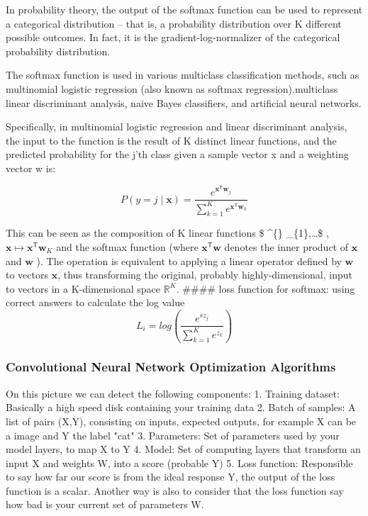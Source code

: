 \documentclass[11pt]{article}
\begin{document}
In probability theory, the output of the softmax function can be used to
represent a categorical distribution -- that is, a probability
distribution over K different possible outcomes. In fact, it is the
gradient-log-normalizer of the categorical probability distribution.

 The softmax function is used in various multiclass classification
methods, such as multinomial logistic regression (also known as softmax
regression).multiclass linear discriminant analysis, naive Bayes
classifiers, and artificial neural networks.

 Specifically, in multinomial logistic regression and linear
discriminant analysis, the input to the function is the result of K
distinct linear functions, and the predicted probability for the j'th
class given a sample vector x and a weighting vector w is:

\[{\displaystyle P(y=j\mid \mathbf {x} )={\frac {e^{\mathbf {x} ^{\mathsf {T}}\mathbf {w} _{j}}}{\sum _{k=1}^{K}e^{\mathbf {x} ^{\mathsf {T}}\mathbf {w} _{k}}}}}\]

 This can be seen as the composition of K linear functions \$
 \mapsto {} \^{}\{\}
\_\{1\},\ldots\$ ,
\(\mathbf {x} \mapsto \mathbf {x} ^{\mathsf {T}}\mathbf {w} _{K}\) and
the softmax function (where \(\mathbf {x} ^{\mathsf {T}}\mathbf {w}\)
denotes the inner product of \(\mathbf {x}\) and \(\mathbf {w}\) ). The
operation is equivalent to applying a linear operator defined by
\(\mathbf {w}\) to vectors \(\mathbf {x}\), thus transforming the
original, probably highly-dimensional, input to vectors in a
K-dimensional space \({\displaystyle \mathbb {R} ^{K}}\). \#\#\#\# loss
function for softmax: using correct answers to calculate the log value
\[L_{i} = log({\frac {e^{sz_{j}}}{\sum _{k=1}^{K}e^{z_{k}}}})\]

    \subsubsection{Convolutional Neural Network Optimization
Algorithms}\label{convolutional-neural-network-optimization-algorithms}

On this picture we can detect the following components: 1. Training
dataset: Basically a high speed disk containing your training data 2.
Batch of samples: A list of pairs (X,Y), consisting on inputs, expected
outputs, for example X can be a image and Y the label "cat" 3.
Parameters: Set of parameters used by your model layers, to map X to Y
4. Model: Set of computing layers that transform an input X and weights
W, into a score (probable Y) 5. Loss function: Responsible to say how
far our score is from the ideal response Y, the output of the loss
function is a scalar. Another way is also to consider that the loss
function say how bad is your current set of parameters W.
\end{document}
